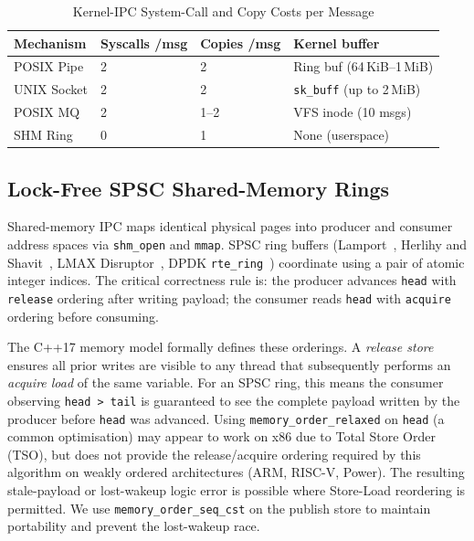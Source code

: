 \documentclass[10pt,conference]{IEEEtran}
\begin{document}
\begin{table}[!t]
  \centering
  \caption{Kernel-IPC System-Call and Copy Costs per Message}
  \label{tab:ipc_cost}
  \small
  \begin{tabular}{@{}L{1.8cm}L{1.5cm}L{1.5cm}L{2.5cm}@{}}
    \toprule
    \textbf{Mechanism} & \textbf{Syscalls /msg} & \textbf{Copies /msg} & \textbf{Kernel buffer} \\
    \midrule
    POSIX Pipe   & 2 & 2 & Ring buf (64\,KiB--1\,MiB) \\
    UNIX Socket  & 2 & 2 & \texttt{sk\_buff} (up to 2\,MiB) \\
    POSIX MQ     & 2 & 1--2 & VFS inode (10 msgs) \\
    SHM Ring     & 0 & 1 & None (userspace) \\
    \bottomrule
  \end{tabular}
\end{table}

\subsection{Lock-Free SPSC Shared-Memory Rings}

Shared-memory IPC maps identical physical pages into producer and consumer
address spaces via \texttt{shm\_open} and \texttt{mmap}.  SPSC ring buffers
(Lamport~\cite{lamport1983}, Herlihy and Shavit~\cite{herlihy2008}, LMAX Disruptor~\cite{disruptor}, DPDK
\texttt{rte\_ring}~\cite{dpdk}) coordinate using a pair of atomic integer
indices.  The critical correctness rule is: the producer advances \texttt{head}
with \texttt{release} ordering after writing payload; the consumer reads
\texttt{head} with \texttt{acquire} ordering before consuming.

The C++17 memory model formally defines these orderings.  A \emph{release
store} ensures all prior writes are visible to any thread that subsequently
performs an \emph{acquire load} of the same variable.  For an SPSC ring, this
means the consumer observing \texttt{head~>~tail} is guaranteed to see the
complete payload written by the producer before \texttt{head} was advanced.
Using \texttt{memory\_order\_relaxed} on \texttt{head} (a common optimisation)
may appear to work on x86 due to Total Store Order (TSO), but does not provide
the release/acquire ordering required by this algorithm on weakly ordered
architectures (ARM, RISC-V, Power).  The resulting stale-payload or
lost-wakeup logic error is possible where Store-Load reordering is permitted.
We use \texttt{memory\_order\_seq\_cst} on the
publish store to maintain portability and prevent the lost-wakeup race.
\end{document}
